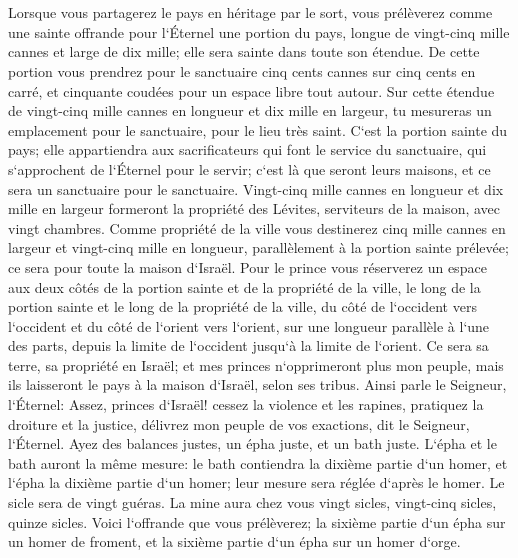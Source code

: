 \chapter{}

\verse Lorsque vous partagerez le pays en héritage par le sort, vous prélèverez comme une sainte offrande pour l`Éternel une portion du pays, longue de vingt-cinq mille cannes et large de dix mille; elle sera sainte dans toute son étendue. 
\verse De cette portion vous prendrez pour le sanctuaire cinq cents cannes sur cinq cents en carré, et cinquante coudées pour un espace libre tout autour. 
\verse Sur cette étendue de vingt-cinq mille cannes en longueur et dix mille en largeur, tu mesureras un emplacement pour le sanctuaire, pour le lieu très saint. 
\verse C`est la portion sainte du pays; elle appartiendra aux sacrificateurs qui font le service du sanctuaire, qui s`approchent de l`Éternel pour le servir; c`est là que seront leurs maisons, et ce sera un sanctuaire pour le sanctuaire. 
\verse Vingt-cinq mille cannes en longueur et dix mille en largeur formeront la propriété des Lévites, serviteurs de la maison, avec vingt chambres. 
\verse Comme propriété de la ville vous destinerez cinq mille cannes en largeur et vingt-cinq mille en longueur, parallèlement à la portion sainte prélevée; ce sera pour toute la maison d`Israël. 
\verse Pour le prince vous réserverez un espace aux deux côtés de la portion sainte et de la propriété de la ville, le long de la portion sainte et le long de la propriété de la ville, du côté de l`occident vers l`occident et du côté de l`orient vers l`orient, sur une longueur parallèle à l`une des parts, depuis la limite de l`occident jusqu`à la limite de l`orient. 
\verse Ce sera sa terre, sa propriété en Israël; et mes princes n`opprimeront plus mon peuple, mais ils laisseront le pays à la maison d`Israël, selon ses tribus. 
\verse Ainsi parle le Seigneur, l`Éternel: Assez, princes d`Israël! cessez la violence et les rapines, pratiquez la droiture et la justice, délivrez mon peuple de vos exactions, dit le Seigneur, l`Éternel. 
\verse Ayez des balances justes, un épha juste, et un bath juste. 
\verse L`épha et le bath auront la même mesure: le bath contiendra la dixième partie d`un homer, et l`épha la dixième partie d`un homer; leur mesure sera réglée d`après le homer. 
\verse Le sicle sera de vingt guéras. La mine aura chez vous vingt sicles, vingt-cinq sicles, quinze sicles. 
\verse Voici l`offrande que vous prélèverez; la sixième partie d`un épha sur un homer de froment, et la sixième partie d`un épha sur un homer d`orge. 
